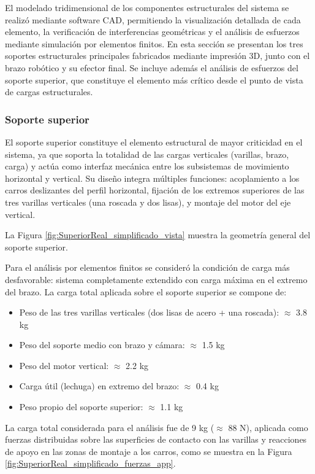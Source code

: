El modelado tridimensional de los componentes estructurales del sistema se realizó mediante software CAD, permitiendo la visualización detallada de cada elemento, la verificación de interferencias geométricas y el análisis de esfuerzos mediante simulación por elementos finitos. En esta sección se presentan los tres soportes estructurales principales fabricados mediante impresión 3D, junto con el brazo robótico y su efector final. Se incluye además el análisis de esfuerzos del soporte superior, que constituye el elemento más crítico desde el punto de vista de cargas estructurales.

\subsubsection{Soporte superior}

El soporte superior constituye el elemento estructural de mayor criticidad en el sistema, ya que soporta la totalidad de las cargas verticales (varillas, brazo, carga) y actúa como interfaz mecánica entre los subsistemas de movimiento horizontal y vertical. Su diseño integra múltiples funciones: acoplamiento a los carros deslizantes del perfil horizontal, fijación de los extremos superiores de las tres varillas verticales (una roscada y dos lisas), y montaje del motor del eje vertical.

La Figura \ref{fig:SuperiorReal_simplificado_vista} muestra la geometría general del soporte superior.

Para el análisis por elementos finitos se consideró la condición de carga más desfavorable: sistema completamente extendido con carga máxima en el extremo del brazo. La carga total aplicada sobre el soporte superior se compone de:

\begin{itemize}[label=$\bullet$]
    \item Peso de las tres varillas verticales (dos lisas de acero + una roscada): $\approx$ 3.8 kg
    \item Peso del soporte medio con brazo y cámara: $\approx$ 1.5 kg
    \item Peso del motor vertical: $\approx$ 2.2 kg
    \item Carga útil (lechuga) en extremo del brazo: $\approx$ 0.4 kg
    \item Peso propio del soporte superior: $\approx$ 1.1 kg
\end{itemize}

La carga total considerada para el análisis fue de 9 kg ($\approx$ 88 N), aplicada como fuerzas distribuidas sobre las superficies de contacto con las varillas y reacciones de apoyo en las zonas de montaje a los carros, como se muestra en la Figura \ref{fig:SuperiorReal_simplificado_fuerzas_app}.

